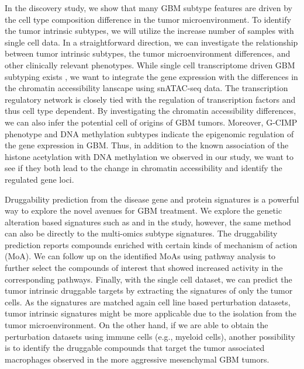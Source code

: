 In the discovery study, we show that many GBM subtype features are driven by the cell type composition difference in the tumor microenvironment. To identify the tumor intrinsic subtypes, we will utilize the increase number of samples with single cell data. In a straightforward direction, we can investigate the relationship between tumor intrinsic subtypes, the tumor microenvironment differences, and other clinically relevant phenotypes. While single cell transcriptome driven GBM subtyping exists \cite{suvaml_tiroshi:GliomaStem2020,pinear_fineha:TumorMicroenvironment2020}, we want to integrate the gene expression with the differences in the chromatin accessibility lanscape using snATAC-seq data. The transcription regulatory network is closely tied with the regulation of transcription factors and thus cell type dependent. By investigating the chromatin accessibility differences, we can also infer the potential cell of origins of GBM tumors. Moreover, G-CIMP phenotype and DNA methylation subtypes indicate the epigenomic regulation of the gene expression in GBM. Thus, in addition to the known association of the histone acetylation with DNA methylation we observed in our study, we want to see if they both lead to the change in chromatin accessibility and identify the regulated gene loci.

Druggability prediction from the disease gene and protein signatures is a powerful way to explore the novel avenues for GBM treatment. We explore the genetic alteration based signatures such as  and  in the study, however, the same method can also be directly to the multi-omics subtype signatures. The druggability prediction reports compounds enriched with certain kinds of mechanism of action (MoA). We can follow up on the identified MoAs using pathway analysis to further select the compounds of interest that showed increased activity in the corresponding pathways. Finally, with the single cell dataset, we can predict the tumor intrinsic druggable targets by extracting the signatures of only the tumor cells. As the signatures are matched again cell line based perturbation datasets, tumor intrinsic signatures might be more applicable due to the isolation from the tumor microenvironment. On the other hand, if we are able to obtain the perturbation datasets using immune cells (e.g., myeloid cells), another possibility is to identify the druggable compounds that target the tumor associated macrophages observed in the more aggressive mesenchymal GBM tumors.
